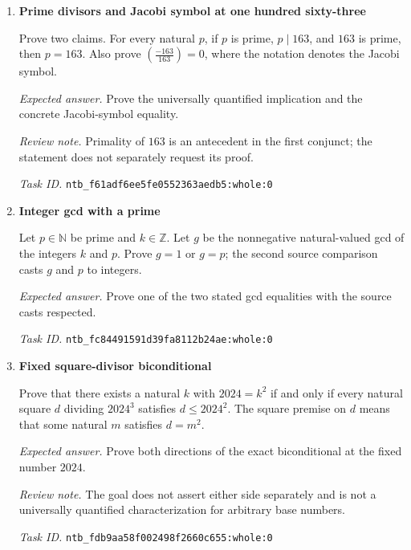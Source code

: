 \documentclass[11pt]{article}
\newcommand{\pth}[1]{\nolinkurl{#1}}
\begin{document}
\begin{enumerate}[label={TEST \arabic*.},leftmargin=4.5em,itemsep=1em]
Prove that there exists $s\in\mathbb N$ with $s=48$, $s>0$, decimal digit sum $12$, and $s\bmod12=0$. Also require $s\le t$ for every positive natural $t$ whose decimal digit sum is $12$ and whose remainder modulo $12$ is zero.

\emph{Expected answer.} Supply $s$ and prove its fixed value, positivity, digit sum, divisibility, and universal minimality.

\emph{Task ID.} \pth{ntb_f571b2ea2148e532749d00e3:whole:0}

\item \textbf{Prime divisors and Jacobi symbol at one hundred sixty-three}\label{qn:test:80}

Prove two claims. For every natural $p$, if $p$ is prime, $p\mid163$, and $163$ is prime, then $p=163$. Also prove $\left(\frac{-163}{163}\right)=0$, where the notation denotes the Jacobi symbol.

\emph{Expected answer.} Prove the universally quantified implication and the concrete Jacobi-symbol equality.

\emph{Review note.} Primality of $163$ is an antecedent in the first conjunct; the statement does not separately request its proof.

\emph{Task ID.} \pth{ntb_f61adf6ee5fe0552363aedb5:whole:0}

\item \textbf{Integer gcd with a prime}\label{qn:test:81}

Let $p\in\mathbb N$ be prime and $k\in\mathbb Z$. Let $g$ be the nonnegative natural-valued gcd of the integers $k$ and $p$. Prove $g=1$ or $g=p$; the second source comparison casts $g$ and $p$ to integers.

\emph{Expected answer.} Prove one of the two stated gcd equalities with the source casts respected.

\emph{Task ID.} \pth{ntb_fc84491591d39fa8112b24ae:whole:0}

\item \textbf{Fixed square-divisor biconditional}\label{qn:test:82}

Prove that there exists a natural $k$ with $2024=k^2$ if and only if every natural square $d$ dividing $2024^3$ satisfies $d\le2024^2$. The square premise on $d$ means that some natural $m$ satisfies $d=m^2$.

\emph{Expected answer.} Prove both directions of the exact biconditional at the fixed number $2024$.

\emph{Review note.} The goal does not assert either side separately and is not a universally quantified characterization for arbitrary base numbers.

\emph{Task ID.} \pth{ntb_fdb9aa58f002498f2660c655:whole:0}

\end{enumerate}

\end{document}

